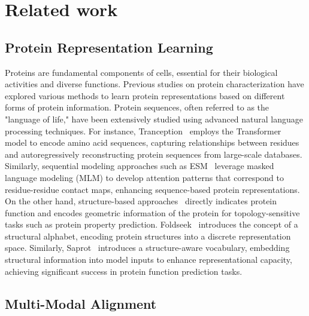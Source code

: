 \section{Related work}
\subsection*{Protein Representation Learning}

Proteins are fundamental components of cells, essential for their biological activities and diverse functions. Previous studies on protein characterization have explored various methods to learn protein representations based on different forms of protein information. Protein sequences, often referred to as the "language of life," have been extensively studied using advanced natural language processing techniques. For instance, Tranception~\cite{notin2022tranception} employs the Transformer~\cite{vaswani2017attention} model to encode amino acid sequences, capturing relationships between residues and autoregressively reconstructing protein sequences from large-scale databases. Similarly, sequential modeling approaches such as ESM~\cite{rives2021biological,lin2023evolutionary,hayes2024simulating} leverage masked language modeling (MLM) to develop attention patterns that correspond to residue-residue contact maps, enhancing sequence-based protein representations.
On the other hand, structure-based approaches~\cite{gligorijevic2021structure,achiam2023gpt} directly indicates protein function and encodes geometric information of the protein for topology-sensitive tasks such as protein property prediction. Foldseek~\cite{van2022foldseek} introduces the concept of a structural alphabet, encoding protein structures into a discrete representation space. Similarly, Saprot~\cite{su2023saprot} introduces a structure-aware vocabulary, embedding structural information into model inputs to enhance representational capacity, achieving significant success in protein function prediction tasks.


\subsection*{Multi-Modal Alignment}


